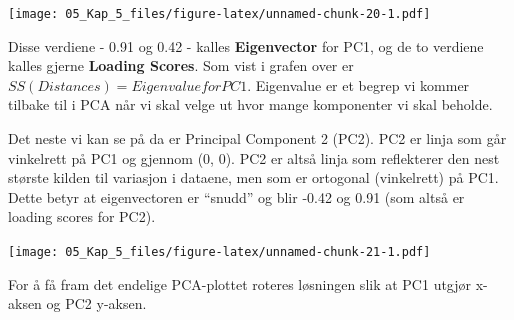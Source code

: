 \documentclass[
]{article}
\newenvironment{Shaded}{\begin{snugshade}}{\end{snugshade}}
\newcommand{\AttributeTok}[1]{\textcolor[rgb]{0.77,0.63,0.00}{#1}}
\newcommand{\CommentTok}[1]{\textcolor[rgb]{0.56,0.35,0.01}{\textit{#1}}}
\newcommand{\DecValTok}[1]{\textcolor[rgb]{0.00,0.00,0.81}{#1}}
\newcommand{\FloatTok}[1]{\textcolor[rgb]{0.00,0.00,0.81}{#1}}
\newcommand{\FunctionTok}[1]{\textcolor[rgb]{0.00,0.00,0.00}{#1}}
\newcommand{\NormalTok}[1]{#1}
\newcommand{\SpecialCharTok}[1]{\textcolor[rgb]{0.00,0.00,0.00}{#1}}
\newcommand{\StringTok}[1]{\textcolor[rgb]{0.31,0.60,0.02}{#1}}
\begin{document}
\texttt{[image: 05\_Kap\_5\_files/figure-latex/unnamed-chunk-20-1.pdf]}

Disse verdiene - 0.91 og 0.42 - kalles \textbf{Eigenvector} for PC1, og de to verdiene kalles gjerne \textbf{Loading Scores}. Som vist i grafen over er \(SS(Distances) = Eigenvalue for PC1\). Eigenvalue er et begrep vi kommer tilbake til i PCA når vi skal velge ut hvor mange komponenter vi skal beholde.

Det neste vi kan se på da er Principal Component 2 (PC2). PC2 er linja som går vinkelrett på PC1 og gjennom (0, 0). PC2 er altså linja som reflekterer den nest største kilden til variasjon i dataene, men som er ortogonal (vinkelrett) på PC1. Dette betyr at eigenvectoren er ``snudd'' og blir -0.42 og 0.91 (som altså er loading scores for PC2).

\begin{Shaded}
\end{Shaded}

\texttt{[image: 05\_Kap\_5\_files/figure-latex/unnamed-chunk-21-1.pdf]}

For å få fram det endelige PCA-plottet roteres løsningen slik at PC1 utgjør x-aksen og PC2 y-aksen.
\end{document}
